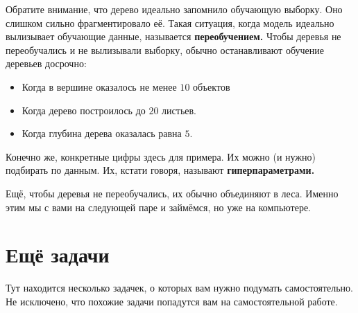 \documentclass[12pt, a4paper, oneside]{article}
\theoremstyle{plain} %
\theoremstyle{definition}
\newcommand{\indef}[1]{\textbf{ \color{green} #1}}
\begin{document}
\begin{solution}
Обратите внимание, что дерево идеально запомнило обучающую выборку. Оно слишком сильно фрагментировало её. Такая ситуация, когда модель идеально вылизывает обучающие данные, называется \indef{переобучением.} Чтобы деревья не переобучались и не вылизывали выборку, обычно останавливают обучение деревьев досрочно: 
	
\begin{itemize} 
	\item  Когда в вершине оказалось не менее $10$ объектов
	\item  Когда дерево построилось до $20$ листьев. 	
	\item  Когда глубина дерева оказалась равна $5$.
\end{itemize}
	
Конечно же, конкретные цифры здесь для примера. Их можно (и нужно) подбирать по данным. Их, кстати говоря, называют \indef{гиперпараметрами.} 

Ещё, чтобы деревья не переобучались, их обычно объединяют в леса. Именно этим мы с вами на следующей паре и займёмся, но уже на компьютере. 
\end{solution}


\section*{Ещё задачи} 

Тут находится несколько задачек, о которых вам нужно подумать самостоятельно. Не исключено, что похожие задачи попадутся вам на самостоятельной работе.
\end{document}
